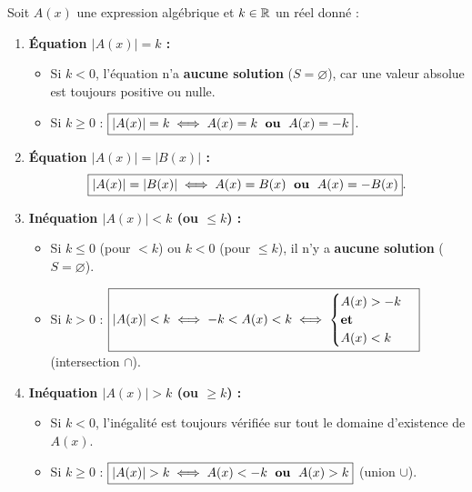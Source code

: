 \begin{theoreme}
Soit $A(x)$ une expression algébrique et $k \in \mathbb{R}$ un réel donné :
\begin{enumerate}
    \item \textbf{Équation $|A(x)| = k$ :}
    \begin{itemize}
        \item Si $k < 0$, l'équation n'a \textbf{aucune solution} ($S = \varnothing$), car une valeur absolue est toujours positive ou nulle.
        \item Si $k \ge 0$ : $\boxed{|A(x)| = k \iff A(x) = k \;\text{ \textbf{ou} }\; A(x) = -k}$.
    \end{itemize}
    \item \textbf{Équation $|A(x)| = |B(x)|$ :}
    \[
        \boxed{|A(x)| = |B(x)| \iff A(x) = B(x) \;\text{ \textbf{ou} }\; A(x) = -B(x)}.
    \]
    \item \textbf{Inéquation $|A(x)| < k$ (ou $\le k$) :}
    \begin{itemize}
        \item Si $k \le 0$ (pour $< k$) ou $k < 0$ (pour $\le k$), il n'y a \textbf{aucune solution} ($S = \varnothing$).
        \item Si $k > 0$ : $\boxed{|A(x)| < k \iff -k < A(x) < k \iff \begin{cases} A(x) > -k \\ \text{\textbf{et}} \\ A(x) < k \end{cases}}$ (intersection $\cap$).
    \end{itemize}
    \item \textbf{Inéquation $|A(x)| > k$ (ou $\ge k$) :}
    \begin{itemize}
        \item Si $k < 0$, l'inégalité est toujours vérifiée sur tout le domaine d'existence de $A(x)$.
        \item Si $k \ge 0$ : $\boxed{|A(x)| > k \iff A(x) < -k \;\text{ \textbf{ou} }\; A(x) > k}$ (union $\cup$).
    \end{itemize}
\end{enumerate}
\end{theoreme}

